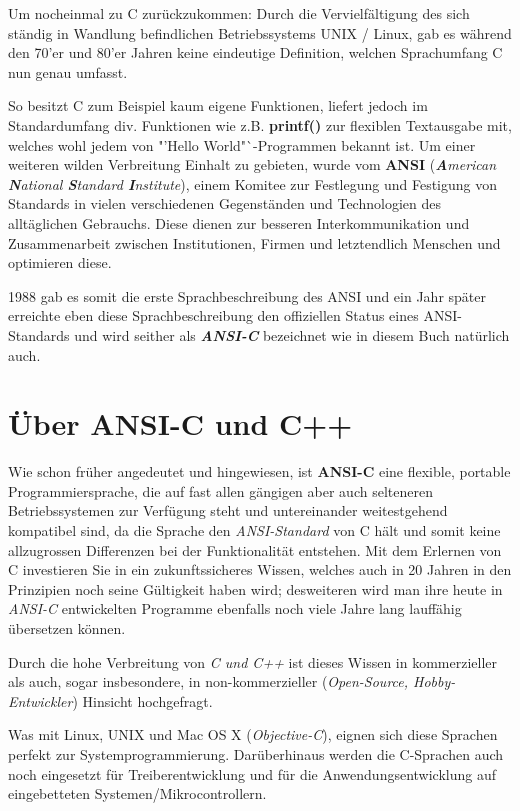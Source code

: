\documentclass[b5paper,10pt,dvips,fleqn,titlepage,twoside]{book}
\begin{document}
Um nocheinmal zu C zurückzukommen: Durch die Vervielfältigung des sich ständig in Wandlung befindlichen Betriebssystems UNIX / Linux, gab es während den 70'er und 80'er Jahren keine eindeutige Definition, welchen Sprachumfang C nun genau umfasst.

So besitzt C zum Beispiel kaum eigene Funktionen, liefert jedoch im Standardumfang div. Funktionen wie z.B. \textbf{printf()} zur flexiblen Textausgabe mit, welches wohl jedem von "'Hello World"`-Programmen bekannt ist.
Um einer weiteren wilden Verbreitung Einhalt zu gebieten, wurde vom \textbf{ANSI} (\emph{\textbf{A}merican \textbf{N}ational \textbf{S}tandard \textbf{I}nstitute}), einem Komitee zur Festlegung und Festigung von Standards in vielen verschiedenen Gegenständen und Technologien des alltäglichen Gebrauchs. Diese dienen zur besseren Interkommunikation und Zusammenarbeit zwischen Institutionen, Firmen und letztendlich Menschen und optimieren diese.

1988 gab es somit die erste Sprachbeschreibung des ANSI und ein Jahr später erreichte eben diese Sprachbeschreibung den offiziellen Status eines ANSI-Standards und wird seither als \textbf{\emph{ANSI-C}} bezeichnet \lbrack wie in diesem Buch natürlich auch.\rbrack
\newline
\section{Über ANSI-C und C++}
Wie schon früher angedeutet und hingewiesen, ist \textbf{ANSI-C} eine flexible, portable Programmiersprache, die auf fast allen gängigen aber auch selteneren Betriebssystemen zur Verfügung steht und untereinander weitestgehend kompatibel sind, da die Sprache den \emph{ANSI-Standard} von C hält und somit keine allzugrossen Differenzen bei der Funktionalität entstehen.
Mit dem Erlernen von C investieren Sie in ein zukunftssicheres Wissen, welches auch in 20 Jahren in den Prinzipien noch seine Gültigkeit haben wird; desweiteren wird man ihre heute in \emph{ANSI-C} entwickelten Programme ebenfalls noch viele Jahre lang lauffähig übersetzen können.

Durch die hohe Verbreitung von \emph{C und C++} ist dieses Wissen in kommerzieller als auch, sogar insbesondere, in non-kommerzieller (\emph{Open-Source, Hobby-Entwickler}) Hinsicht hochgefragt.

Was mit Linux, UNIX und Mac OS X (\emph{Objective-C}), eignen sich diese Sprachen perfekt zur Systemprogrammierung. Darüberhinaus werden die C-Sprachen auch noch eingesetzt für Treiberentwicklung und für die Anwendungsentwicklung auf eingebetteten Systemen/Mikrocontrollern.
\end{document}
